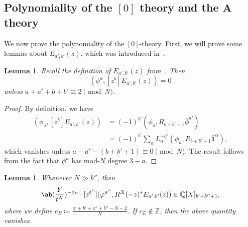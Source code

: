 \documentclass[10pt]{amsart}
\newtheorem{lem}[thm]{Lemma}
\theoremstyle{definition}
\theoremstyle{remark}
\theoremstyle{plain}
\theoremstyle{definition}
\theoremstyle{remark}
\newcommand{\Z}{\mathbb{Z}}
\newcommand{\Q}{\mathbb{Q}}
\newcommand{\bA}{\mathbf{A}}
\newcommand{\1}{\mathbf{1}}
\newcommand{\2}{\mathbf{2}}
\newcommand{\3}{\mathbf{3}}
\numberwithin{equation}{section}
\begin{document}
\subsection{Polynomiality of the $[0]$ theory and the $\bA$ theory}%
\label{sub:Polynomiality of the 0 theory}

We now prove the polynomiality of the $[0]$-theory. First, we will prove some lemmas about $E_{a',b'}(z)$, which was introduced in~.

\begin{lem}\label{lem:vanishingcoeffedge}
    Recall the definition of $E_{a',b'}(z)$ from~. Then 
    \[ (\phi^a, [z^b] E_{a',b'}(z)) = 0 \]
    unless $a+a'+b+b' \equiv 2 \pmod{N}$.
\end{lem}

\begin{proof}
    By definition, we have
    \begin{align*}
        (\phi_a, [z^b] E_{a',b'}(z)) &= (-1)^{b'}(\phi_a, R_{b+b'+1} \bar{\phi}^{a'}) \\
        &= (-1)^{b'}  \sum_{\alpha} L_{\alpha}^{-a'} (\phi_a, R_{b+b'+1} \bar{\1}^{\alpha}),
    \end{align*}
    which vanishes unless $a-a'-(b+b'+1) \equiv 0 \pmod{N}$. The result follows from the fact that $\phi^a$ has mod-$N$ degree $3-a$.
\end{proof}

\begin{lem}\label{lem:degreecoeffedge}
    Whenever $N \gg b''$, then
    \[ \ab(\frac{Y}{t^N})^{-c_E} \cdot [z^{b''}] (\varphi^{a''}, R^X(-z)^* E_{a',b'}(z)) \in \Q[X]_{b'+b''+1}, \]
    where we define $c_E \coloneqq \frac{a'+b'+a''+b''-N-2}{N}$. If $c_E \notin \Z$, then the above quantity vanishes.
\end{lem}
\end{document}
